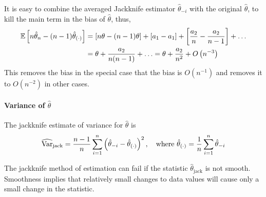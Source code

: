 \begin{remark}
	It is easy to combine the averaged Jackknife estimator $\hat{\theta}_{-i}$ with the original $\hat{\theta}$, to kill the main term in the bias of $\hat{\theta}$, thus,
	\begin{equation*}
		\begin{aligned}
			{\mathbb E}\left[n\hat{\theta}_{n}-(n-1)\hat{\theta}_{(\cdot)}\right] & =\left[n\theta-(n-1)\theta\right]+\left[a_{1}-a_{1}\right]+\left[\frac{a_{2}}{n}-\frac{a_{2}}{n-1}\right]+\ldots \\
			                                                               & =\theta+\frac{a_{2}}{n(n-1)}+\ldots=\theta+\frac{a_{2}}{n^{2}}+O\left(n^{-3}\right)
		\end{aligned}
	\end{equation*}
	This removes the bias in the special case that the bias is $O\left(n^{-1}\right)$ and removes it to $O\left(n^{-2}\right)$ in other cases.
\end{remark}

\paragraph{Variance of $\hat{\theta}$}

The jackknife estimate of variance for $\hat{\theta}$ is
\begin{equation}
	\widehat{\mathrm{Var}}_{\text{jack}}=\frac{n-1}{n}\sum_{i=1}^{n}\left(\hat{\theta}_{-i}-\hat{\theta}_{(\cdot)}\right)^{2},\quad\text{where }\hat{\theta}_{(\cdot)}=\frac{1}{n}\sum_{i=1}^{n}\hat{\theta}_{-i}
\end{equation}

The jackknife method of estimation can fail if the statistic $\hat{\theta}_{\text{jack}}$ is not smooth. Smoothness
implies that relatively small changes to data values will cause only a small change in the
statistic.

\begin{example}

\end{example}

\begin{example}

\end{example}
